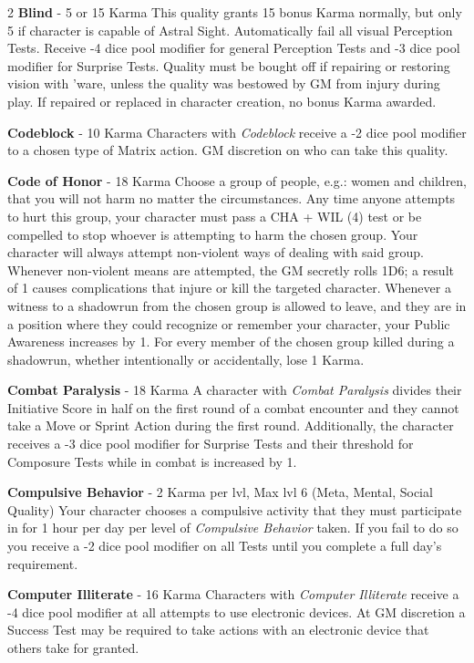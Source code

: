 \documentclass[
  oneside]{article}
\begin{document}
\begin{multicols}{2}
\textbf{Blind} - 5 or 15 Karma This quality grants
15 bonus Karma normally, but only 5 if character
is capable of Astral Sight. Automatically fail all
visual Perception Tests. Receive -4 dice pool
modifier for general Perception Tests and -3 dice
pool modifier for Surprise Tests. Quality must be
bought off if repairing or restoring vision with
'ware, unless the quality was bestowed by GM from
injury during play. If repaired or replaced in
character creation, no bonus Karma awarded.

\textbf{Codeblock} - 10 Karma Characters with
\emph{Codeblock} receive a -2 dice pool modifier
to a chosen type of Matrix action. GM discretion
on who can take this quality.

\textbf{Code of Honor} - 18 Karma Choose a group
of people, e.g.: women and children, that you will
not harm no matter the circumstances. Any time
anyone attempts to hurt this group, your character
must pass a CHA + WIL (4) test or be compelled to
stop whoever is attempting to harm the chosen
group. Your character will always attempt
non-violent ways of dealing with said group.
Whenever non-violent means are attempted, the GM
secretly rolls 1D6; a result of 1 causes
complications that injure or kill the targeted
character. Whenever a witness to a shadowrun from
the chosen group is allowed to leave, and they are
in a position where they could recognize or
remember your character, your Public Awareness
increases by 1. For every member of the chosen
group killed during a shadowrun, whether
intentionally or accidentally, lose 1 Karma.

\textbf{Combat Paralysis} - 18 Karma A character
with \emph{Combat Paralysis} divides their
Initiative Score in half on the first round of a
combat encounter and they cannot take a Move or
Sprint Action during the first round.
Additionally, the character receives a -3 dice
pool modifier for Surprise Tests and their
threshold for Composure Tests while in combat is
increased by 1.

\textbf{Compulsive Behavior} - 2 Karma per lvl,
Max lvl 6 (Meta, Mental, Social Quality) Your
character chooses a compulsive activity that they
must participate in for 1 hour per day per level
of \emph{Compulsive Behavior} taken. If you fail
to do so you receive a -2 dice pool modifier on
all Tests until you complete a full day's
requirement.

\textbf{Computer Illiterate} - 16 Karma Characters
with \emph{Computer Illiterate} receive a -4 dice
pool modifier at all attempts to use electronic
devices. At GM discretion a Success Test may be
required to take actions with an electronic device
that others take for granted.


\end{multicols}
\end{document}
